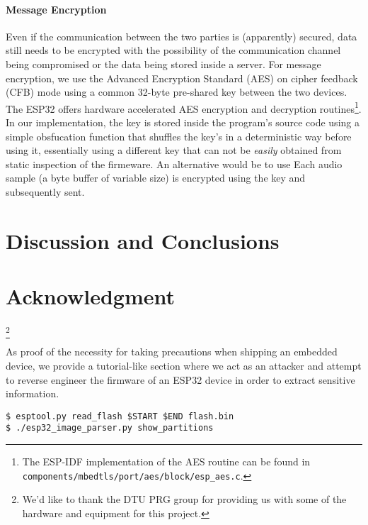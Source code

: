 \documentclass[conference]{IEEEtran}
\begin{document}
\paragraph{Message Encryption}

Even if the communication between the two parties is (apparently) secured, data still needs to be encrypted with the possibility 
of the communication channel being compromised or the data being stored inside a server.
For message encryption, we use the Advanced Encryption Standard (AES) on cipher feedback (CFB) mode using 
a common 32-byte pre-shared key between the two devices.
The ESP32 offers hardware accelerated AES encryption and decryption routines\footnote{The ESP-IDF implementation of the AES routine can be found in \texttt{components/mbedtls/port/aes/block/esp\_aes.c}.}.
In our implementation, the key is stored inside the program's source code using 
a simple obsfucation function that shuffles the key's in a deterministic way before using it, essentially
using a different key that can not be \textit{easily} obtained from static inspection of the firmeware.
An alternative would be to use 
Each audio sample (a byte buffer of variable size) is encrypted using the key 
and subsequently sent.


\section{Discussion and Conclusions}
\label{sec:discussion_and_conclusions}

\section*{Acknowledgment}

\thanks{We'd like to thank the DTU PRG group for providing us with some of the hardware and equipment for this project.}




\appendices
{}

\label{appendix:reverse_engineering}

As proof of the necessity for taking precautions when shipping an embedded device, 
we provide a tutorial-like section where we act as an attacker and attempt to reverse engineer the firmware of an ESP32
device in order to extract sensitive information.

\begin{listing}[h]
\begin{verbatim}
$ esptool.py read_flash $START $END flash.bin
$ ./esp32_image_parser.py show_partitions
\end{verbatim}
\end{listing}
\end{document}

